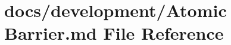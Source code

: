 \hypertarget{Atomic_01Barrier_8md}{\section{docs/development/\+Atomic Barrier.\+md File Reference}
\label{Atomic_01Barrier_8md}
}
